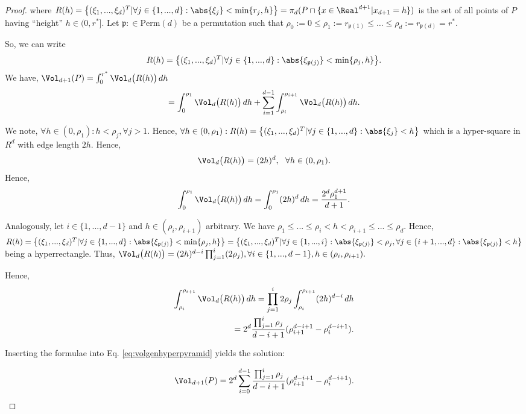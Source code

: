 \begin{lem}
\begin{proof}
where $R(h) = \bigl\{(\xi_1,...,\xi_d)^T \vert  \forall  j \in \{1,...,d\} :\abs{\xi_j} < \min\{r_j,h \} \bigr\} = \pi_d(P \cap \{x \in \Real^{d+1} | x_{d+1} =h \})$ is the set of all points of $P$ having ``height'' $h \in (0,r^*]$.
Let $\mathfrak p: \in \text{Perm}(d)$ be a permutation such that $\rho_0 := 0 \leq \rho_1 := r_{\mathfrak p(1)}\leq \ldots \leq \rho_d := r_{\mathfrak p(d)} =r^*$.

So, we can write \[R(h) = \bigl\{(\xi_1,...,\xi_d)^T \vert  \forall  j \in \{1,...,d\} :\abs{\xi_{\mathfrak p (j)}} < \min\{\rho_j,h \} \bigr\}. \]
We have, 
$\Vol_{d+1}(P) = \int_0^{r^*} \Vol_d \bigl(R(h)\bigr) \, dh$ 
\begin{equation}
\label{eq:volgenhyperpyramid}
= \int_0^{\rho_1} \Vol_d \bigl(R(h)\bigr) \, dh + \sum_{i=1}^{d-1} \int_{\rho_i}^{\rho_{i+1}} \Vol_d \bigl(R(h)\bigr) \, dh.
\end{equation}

We note,
$\forall h \in (0, \rho_1):  h < \rho_j, \forall j >1$. Hence, $\forall h \in (0, \rho_1): R(h) = \bigl\{(\xi_1,...,\xi_d)^T \vert  \forall  j \in \{1,...,d\} :\abs{\xi_j} < h \bigr\}$ which is a hyper-square in $R^d$ with edge length $2h$. Hence, \[\Vol_d\bigl(R(h)\bigr) = (2h)^d, \,\,\,\, \forall h \in (0, \rho_1).\] 
Hence, 
\begin{equation}
\int_0^{\rho_1} \Vol_d\bigl(R(h)\bigr) \, dh = \int_0^{\rho_1} (2h)^d \, dh = \frac{2^d \rho_1^{d+1}}{d+1}.
\end{equation}

Analogously, let  $i \in \{1,...,d-1\}$ and  $h \in (\rho_i, \rho_{i+1})$ arbitrary. We have $  \rho_1 \leq ... \leq \rho_i <h < \rho_{i+1} \leq ... \leq \rho_d$. Hence, $R(h) = \bigl\{(\xi_1,...,\xi_d)^T \vert  \forall  j \in \{1,...,d\} :\abs{\xi_{\mathfrak p (j)}} < \min\{\rho_j,h \} \bigr\} = \bigl\{(\xi_1,...,\xi_d)^T \vert  \forall  j \in \{1,...,i\} :\abs{\xi_{\mathfrak p (j)}} < \rho_j,  \forall  j \in \{i+1,...,d\} :\abs{\xi_{\mathfrak p (j)}} < h \bigr\}$ being a hyperrectangle. 
Thus, $\Vol_d\bigl(R(h) \bigr) = (2h)^{d-i} \prod_{j=1}^{i} (2\rho_j), \forall i \in \{1,...,d-1\}, h \in (\rho_i, \rho_{i+1}).$

Hence, 
\begin{eqnarray}
\int_{\rho_i}^{\rho_{i+1}} \Vol_d\bigl(R(h)\bigr) \, dh = \prod_{j=1}^{i} 2\rho_j \int_{\rho_i}^{\rho_{i+1}} (2h)^{d-i}  \, dh \\= 2^d \frac{\prod_{j=1}^{i} \rho_j }{d-i+1} (\rho_{i+1}^{d-i+1} - \rho_{i}^{d-i+1} ).
\end{eqnarray}

Inserting the formulae into Eq. \ref{eq:volgenhyperpyramid} yields the solution:

\[\Vol_{d+1}(P) = 2^d \sum_{i=0}^{d-1} \frac{\prod_{j=1}^{i} \rho_j }{d-i+1} (\rho_{i+1}^{d-i+1} - \rho_{i}^{d-i+1} ). \]

\end{proof}
\end{lem}

